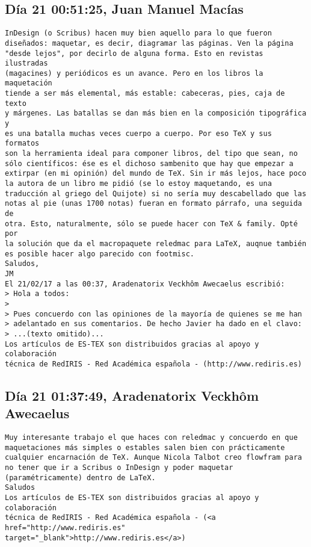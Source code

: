 \documentclass[a4paper,10pt]{article}
\begin{document}
\subsection{Día 21 00:51:25, Juan Manuel Macías}

\begin{lstlisting}
InDesign (o Scribus) hacen muy bien aquello para lo que fueron 
diseñados: maquetar, es decir, diagramar las páginas. Ven la página 
"desde lejos", por decirlo de alguna forma. Esto en revistas ilustradas 
(magacines) y periódicos es un avance. Pero en los libros la maquetación 
tiende a ser más elemental, más estable: cabeceras, pies, caja de texto 
y márgenes. Las batallas se dan más bien en la composición tipográfica y 
es una batalla muchas veces cuerpo a cuerpo. Por eso TeX y sus formatos 
son la herramienta ideal para componer libros, del tipo que sean, no 
sólo científicos: ése es el dichoso sambenito que hay que empezar a 
extirpar (en mi opinión) del mundo de TeX. Sin ir más lejos, hace poco 
la autora de un libro me pidió (se lo estoy maquetando, es una 
traducción al griego del Quijote) si no sería muy descabellado que las 
notas al pie (unas 1700 notas) fueran en formato párrafo, una seguida de 
otra. Esto, naturalmente, sólo se puede hacer con TeX & family. Opté por 
la solución que da el macropaquete reledmac para LaTeX, auqnue también 
es posible hacer algo parecido con footmisc.
Saludos,
JM
El 21/02/17 a las 00:37, Aradenatorix Veckhôm Awecaelus escribió:
> Hola a todos:
>
> Pues concuerdo con las opiniones de la mayoría de quienes se me han
> adelantado en sus comentarios. De hecho Javier ha dado en el clavo:
> ...(texto omitido)...
Los artículos de ES-TEX son distribuidos gracias al apoyo y colaboración 
técnica de RedIRIS - Red Académica española - (http://www.rediris.es)

\end{lstlisting}

\subsection{Día 21 01:37:49, Aradenatorix Veckhôm Awecaelus}

\begin{lstlisting}
Muy interesante trabajo el que haces con reledmac y concuerdo en que
maquetaciones más simples o estables salen bien con prácticamente
cualquier encarnación de TeX. Aunque Nicola Talbot creo flowfram para
no tener que ir a Scribus o InDesign y poder maquetar
(paramétricamente) dentro de LaTeX.
Saludos
Los artículos de ES-TEX son distribuidos gracias al apoyo y colaboración 
técnica de RedIRIS - Red Académica española - (<a href="http://www.rediris.es" target="_blank">http://www.rediris.es</a>)

\end{lstlisting}
\end{document}
